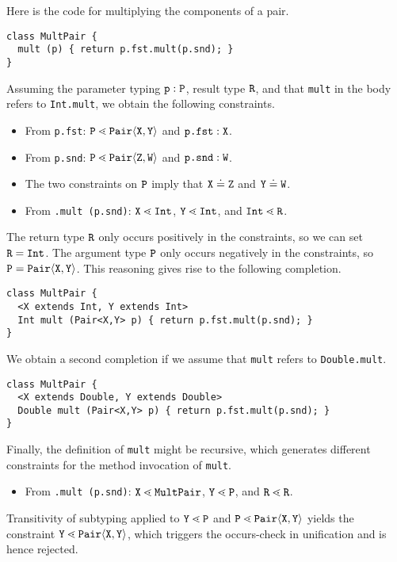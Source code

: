 Here is the \TFGJ code  for multiplying the components of a pair.
\begin{lstlisting}
class MultPair {
  mult (p) { return p.fst.mult(p.snd); }
}
\end{lstlisting}
Assuming the parameter typing ${\tt p}:{\tt P}$, result type ${\tt R}$, and that
\texttt{mult} in the body refers to \texttt{Int.mult}, we
obtain the following constraints.
\begin{itemize}
\item From \texttt{p.fst}: ${\tt P} \lessdot \mathtt{Pair}\langle{\tt X},{\tt Y}\rangle$ and
  $\texttt{p.fst} : {\tt X}$.
\item From \texttt{p.snd}: ${\tt P} \lessdot \mathtt{Pair}\langle{\tt Z},{\tt W}\rangle$ and
  $\texttt{p.snd} : {\tt W}$.
\item The two constraints on ${\tt P}$ imply that ${\tt X} \doteq {\tt Z}$ and
  ${\tt Y} \doteq {\tt W}$.
\item From \texttt{.mult (p.snd)}: ${\tt X} \lessdot \mathtt{Int}$, ${\tt Y} \lessdot
  \mathtt{Int}$, and $\mathtt{Int} \lessdot {\tt R}$.
\end{itemize}
The return type ${\tt R}$ only occurs positively in the constraints, so we can
set ${\tt R} = \mathtt{Int}$.
The argument type ${\tt P}$ only occurs negatively in the constraints,
so ${\tt P} = \mathtt{Pair} \langle{\tt X},{\tt Y}\rangle$.
This reasoning gives rise to the following completion.
\begin{lstlisting}
class MultPair {
  <X extends Int, Y extends Int>
  Int mult (Pair<X,Y> p) { return p.fst.mult(p.snd); }
}
\end{lstlisting}
We obtain a second completion if we assume that \texttt{mult} refers to
\texttt{Double.mult}.
\begin{lstlisting}
class MultPair {
  <X extends Double, Y extends Double>
  Double mult (Pair<X,Y> p) { return p.fst.mult(p.snd); }
}
\end{lstlisting}

Finally, the definition of \texttt{mult} might be recursive, which
generates different constraints for the method invocation of \texttt{mult}.
\begin{itemize}
\item From \texttt{.mult (p.snd)}: ${\tt X} \lessdot \mathtt{MultPair}$, ${\tt Y} \lessdot
  \mathtt{P}$, and $\mathtt{R} \lessdot {\tt R}$.
\end{itemize}
Transitivity of subtyping applied to ${\tt Y} \lessdot \mathtt{P}$ and ${\tt P} \lessdot \mathtt{Pair}\langle{\tt X},{\tt Y}\rangle$
yields the constraint ${\tt Y} \lessdot \mathtt{Pair}\langle{\tt X},{\tt Y}\rangle$, which triggers the
occurs-check in unification and is hence rejected. 

